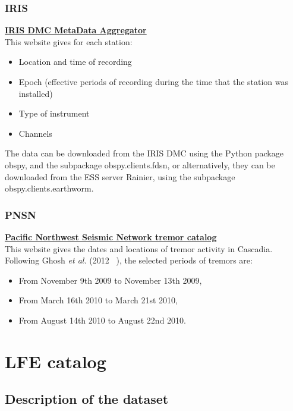 \documentclass[main.tex]{subfiles}
\begin{document}
\subsection{IRIS}

\href{http://ds.iris.edu/mda}{\textbf{IRIS DMC MetaData Aggregator}} \\

This website gives for each station:
\begin{itemize}
	\item Location and time of recording
	\item Epoch (effective periods of recording during the time that the station was installed)
	\item Type of instrument
	\item Channels
\end{itemize}

The data can be downloaded from the IRIS DMC using the Python package obspy, and the subpackage obspy.clients.fdsn, or alternatively, they can be downloaded from the ESS server Rainier, using the subpackage obspy.clients.earthworm.

\subsection{PNSN}

\href{https://www.pnsn.org/tremor}{\textbf{Pacific Northwest Seismic Network tremor catalog}} \\

This website gives the dates and locations of tremor activity in Cascadia. Following Ghosh \textit{et al.} (2012 ~\cite{GHO_2012}), the selected periods of tremors are:
\begin{itemize}
	\item From November 9th 2009 to November 13th 2009,
	\item From March 16th 2010 to March 21st 2010,
	\item From August 14th 2010 to August 22nd 2010.
\end{itemize}

\chapter{LFE catalog}

\section{Description of the dataset}
\end{document}
